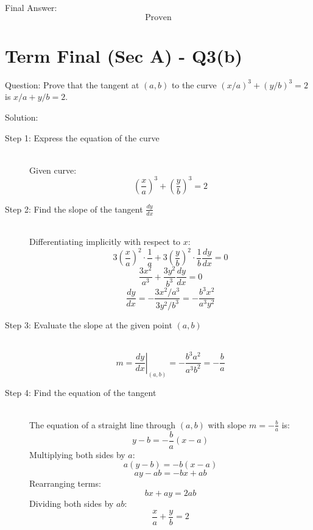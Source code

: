 \documentclass[11pt, a4paper]{article}
\begin{document}
Final Answer:
\[ 
\boxed{\text{Proven}} 
\]



\section*{Term Final (Sec A) - Q3(b)}

Question:
Prove that the tangent at $(a, b)$ to the curve $(x/a)^3 + (y/b)^3 = 2$ is $x/a + y/b = 2$.

Solution:

\begin{description}
    \item[Step 1: Express the equation of the curve] \ \\
    Given curve:
    \[ \left(\frac{x}{a}\right)^3 + \left(\frac{y}{b}\right)^3 = 2 \]

    \item[Step 2: Find the slope of the tangent $\frac{dy}{dx}$] \ \\
    Differentiating implicitly with respect to $x$:
    \[ 3\left(\frac{x}{a}\right)^2 \cdot \frac{1}{a} + 3\left(\frac{y}{b}\right)^2 \cdot \frac{1}{b} \frac{dy}{dx} = 0 \]
    \[ \frac{3x^2}{a^3} + \frac{3y^2}{b^3} \frac{dy}{dx} = 0 \]
    \[ \frac{dy}{dx} = -\frac{3x^2 / a^3}{3y^2 / b^3} = -\frac{b^3 x^2}{a^3 y^2} \]

    \item[Step 3: Evaluate the slope at the given point $(a, b)$] \ \\
    \[ m = \left. \frac{dy}{dx} \right|_{(a,b)} = -\frac{b^3 a^2}{a^3 b^2} = -\frac{b}{a} \]

    \item[Step 4: Find the equation of the tangent] \ \\
    The equation of a straight line through $(a, b)$ with slope $m = -\frac{b}{a}$ is:
    \[ y - b = -\frac{b}{a}(x - a) \]
    Multiplying both sides by $a$:
    \[ a(y - b) = -b(x - a) \]
    \[ ay - ab = -bx + ab \]
    Rearranging terms:
    \[ bx + ay = 2ab \]
    Dividing both sides by $ab$:
    \[ \frac{x}{a} + \frac{y}{b} = 2 \]
\end{description}
\end{document}
